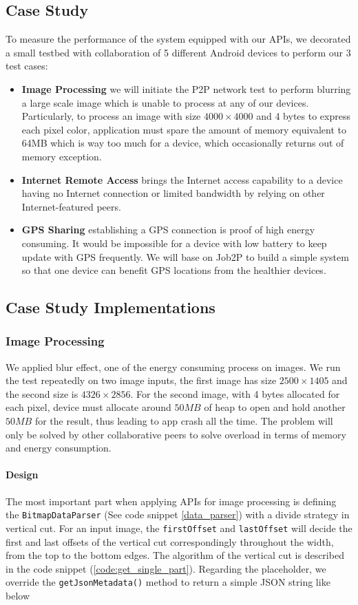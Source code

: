 \documentclass[conference]{IEEEtran}
\begin{document}
\subsection{Case Study}
To measure the performance of the system equipped with our APIs, we decorated a small testbed with collaboration of 5 different Android devices to perform our 3 test cases:
\begin{itemize}
	\item \textbf{Image Processing} we will initiate the P2P network test to perform blurring a large scale image which is unable to process at any of our devices. Particularly, to process an image with size $4000 \times 4000$ and 4 bytes to express each pixel color, application must spare the amount of memory equivalent to 64MB which is way too much for a device, which occasionally returns out of memory exception.
	\item \textbf{Internet Remote Access} brings the Internet access capability to a device having no Internet connection or limited bandwidth by relying on other Internet-featured peers.
	\item \textbf{GPS Sharing} establishing a GPS connection is proof of high energy consuming. It would be impossible for a device with low battery to keep update with GPS frequently. We will base on Job2P to build a simple system so that one device can benefit GPS locations from the healthier devices.
\end{itemize}

\subsection{Case Study Implementations}

\subsubsection{Image Processing}
We applied blur effect, one of the energy consuming process on images. We run the test repeatedly on two image inputs, the first image has size $2500 \times 1405$ and the second size is $4326 \times 2856$. For the second image, with 4 bytes allocated for each pixel, device must allocate around $50MB$ of heap to open and hold another $50MB$ for the result, thus leading to app crash all the time. The problem will only be solved by other collaborative peers to solve overload in terms of memory and energy consumption.

\paragraph{Design}
The most important part when applying APIs for image processing is defining the \texttt{BitmapDataParser} (See code snippet \ref{data_parser}) with a divide strategy in vertical cut. For an input image, the \texttt{firstOffset} and \texttt{lastOffset} will decide the first and last offsets of the vertical cut correspondingly throughout the width, from the top to the bottom edges. The algorithm of the vertical cut is described in the code snippet (\ref{code:get_single_part}). Regarding the placeholder, we override the \texttt{getJsonMetadata()} method to return a simple JSON string like below\\
\end{document}
